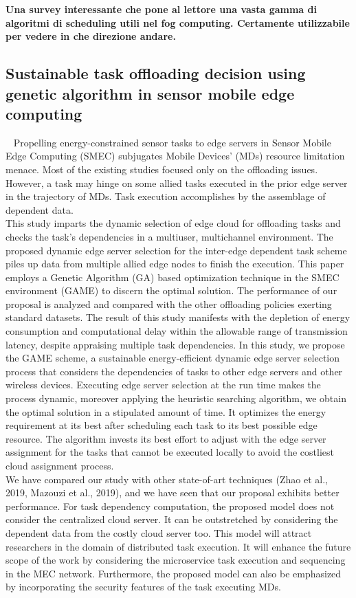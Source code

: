 \textbf{Una survey interessante che pone al lettore una vasta gamma di algoritmi di scheduling utili nel fog computing.
Certamente utilizzabile per vedere in che direzione andare.}


\subsection{Sustainable task offloading decision using genetic algorithm in sensor mobile edge computing}~\cite{chakraborty2022sustainable}
Propelling energy-constrained sensor tasks to edge servers in Sensor Mobile Edge Computing (SMEC) subjugates Mobile Devices' (MDs) 
resource limitation menace. Most of the existing studies focused only on the offloading issues. 
However, a task may hinge on some allied tasks executed in the prior edge server in the trajectory of MDs. 
Task execution accomplishes by the assemblage of dependent data.\\
This study imparts the dynamic selection of edge cloud for offloading tasks and checks the task’s dependencies in a multiuser, 
multichannel environment. The proposed dynamic edge server selection for the inter-edge dependent task scheme piles up data from multiple 
allied edge nodes to finish the execution. 
This paper employs a Genetic Algorithm (GA) based optimization technique in the SMEC environment (GAME) to discern the optimal solution. 
The performance of our proposal is analyzed and compared with the other offloading policies exerting standard datasets. 
The result of this study manifests with the depletion of energy consumption and computational delay within the allowable range of transmission 
latency, despite appraising multiple task dependencies.
In this study, we propose the GAME scheme, a sustainable energy-efficient dynamic edge server selection process that considers the dependencies of tasks to other 
edge servers and other wireless devices. 
Executing edge server selection at the run time makes the process dynamic, moreover applying the heuristic searching algorithm, 
we obtain the optimal solution in a stipulated amount of time. 
It optimizes the energy requirement at its best after scheduling each task to its best possible edge resource. 
The algorithm invests its best effort to adjust with the edge server assignment for the tasks that cannot be 
executed locally to avoid the costliest cloud assignment process.\\
We have compared our study with other state-of-art techniques (Zhao et al., 2019, Mazouzi et al., 2019), 
and we have seen that our proposal exhibits better performance.
For task dependency computation, the proposed model does not consider the centralized cloud server. 
It can be outstretched by considering the dependent data from the costly cloud server too. 
This model will attract researchers in the domain of distributed task execution. 
It will enhance the future scope of the work by considering the microservice task execution and sequencing in the MEC network. 
Furthermore, the proposed model can also be emphasized by incorporating the security features of the task executing MDs.\\

